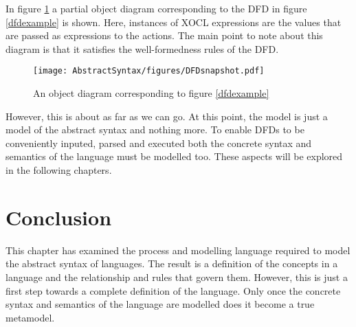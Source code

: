 In figure \ref{dfdsnapshot} a partial object diagram corresponding to the DFD in figure \ref{dfdexample} is shown. Here, instances of XOCL expressions are the values that are passed as expressions to the actions. The main point to note about this diagram is that it satisfies the well-formedness rules of the DFD. 

\begin{figure}[htb]
\begin{center}
\texttt{[image: AbstractSyntax/figures/DFDsnapshot.pdf]}
\caption{An object diagram corresponding to figure \ref{dfdexample}}
\label{dfdsnapshot}
\end{center}
\end{figure}

However, this is about as far as we can go. At this point, the model is just a model of the abstract syntax and nothing more. To enable DFDs to be conveniently inputed, parsed and executed both the concrete syntax and semantics of the language must be modelled too. These aspects will be explored in the following chapters. 

\section{Conclusion}

This chapter has examined the process and modelling language required to model the abstract syntax of languages. The result is a definition of the concepts in a language and the relationship and rules that govern them. However, this is just a first step towards a complete definition of the language. Only once the concrete syntax and semantics of the language are modelled does it become a true metamodel.

